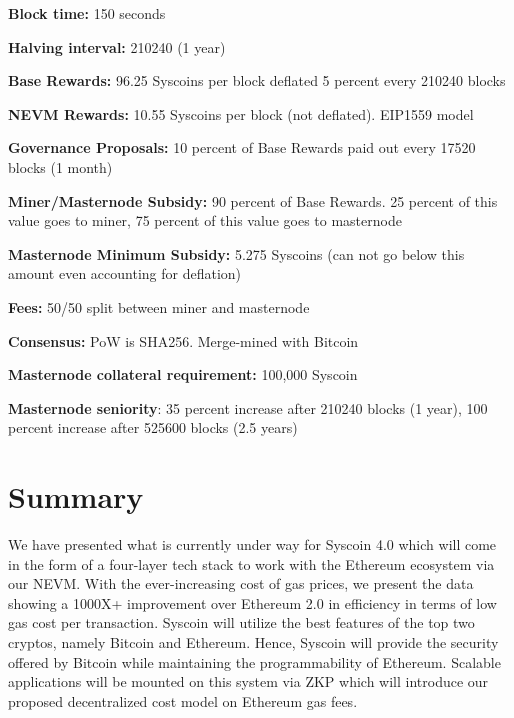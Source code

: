 \documentclass[peerreview]{ieeesyscoin}
\begin{document}
\begin{description}[font=$\bullet$~\normalfont\scshape\color{blue!50!black}]
\item \textbf{Block time:} 150 seconds
\item \textbf{Halving interval:} 210240 (1 year)
\item \textbf{Base Rewards:}  96.25 Syscoins per block deflated 5 percent every 210240 blocks
\item \textbf{NEVM Rewards:}  10.55 Syscoins per block (not deflated). EIP1559 model
\item \textbf{Governance Proposals:}  10 percent of Base Rewards paid out every 17520 blocks (1 month)
\item \textbf{Miner/Masternode Subsidy:}  90 percent of Base Rewards. 25 percent of this value goes to miner, 75 percent of this value goes to masternode
\item \textbf{Masternode Minimum Subsidy:} 5.275 Syscoins (can not go below this amount even accounting for deflation)
\item \textbf{Fees:}  50/50 split between miner and masternode
\item \textbf{Consensus:} PoW is SHA256. Merge-mined with Bitcoin
\item \textbf{Masternode collateral requirement:} 100,000 Syscoin
\item \textbf{Masternode seniority}: 35 percent increase after 210240 blocks (1 year), 100 percent increase after 525600 blocks (2.5 years)
\end{description}

\section{Summary}
\label{section:summary}
We have presented what is currently under way for Syscoin 4.0 which will come in the form of a four-layer tech stack to work with the Ethereum ecosystem via our NEVM. With the ever-increasing cost of gas prices, we present the data showing a 1000X+ improvement over Ethereum 2.0 in efficiency in terms of low gas cost per transaction. Syscoin will utilize the best features of the top two cryptos, namely Bitcoin and Ethereum. Hence, Syscoin will provide the security offered by Bitcoin while maintaining the programmability of Ethereum. Scalable applications will be mounted on this system via ZKP which will introduce our proposed decentralized cost model on Ethereum gas fees.

\appendices
\end{document}
